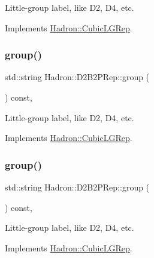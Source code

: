 Little-\/group label, like D2, D4, etc. 

Implements \mbox{\hyperlink{structHadron_1_1CubicLGRep_a9bdb14b519a611d21379ed96a3a9eb41}{Hadron\+::\+Cubic\+L\+G\+Rep}}.

\mbox{\label{structHadron_1_1D2B2PRep_a5e6b85d31dc1c9bec4956b4c6bccd01e}} 
\subsubsection{\texorpdfstring{group()}{group()}\hspace{0.1cm}{\footnotesize\ttfamily [2/3]}}
{\footnotesize\ttfamily std\+::string Hadron\+::\+D2\+B2\+P\+Rep\+::group (\begin{DoxyParamCaption}{ }\end{DoxyParamCaption}) const\hspace{0.3cm}{\ttfamily [inline]}, {\ttfamily [virtual]}}

Little-\/group label, like D2, D4, etc. 

Implements \mbox{\hyperlink{structHadron_1_1CubicLGRep_a9bdb14b519a611d21379ed96a3a9eb41}{Hadron\+::\+Cubic\+L\+G\+Rep}}.

\mbox{\label{structHadron_1_1D2B2PRep_a5e6b85d31dc1c9bec4956b4c6bccd01e}} 
\subsubsection{\texorpdfstring{group()}{group()}\hspace{0.1cm}{\footnotesize\ttfamily [3/3]}}
{\footnotesize\ttfamily std\+::string Hadron\+::\+D2\+B2\+P\+Rep\+::group (\begin{DoxyParamCaption}{ }\end{DoxyParamCaption}) const\hspace{0.3cm}{\ttfamily [inline]}, {\ttfamily [virtual]}}

Little-\/group label, like D2, D4, etc. 

Implements \mbox{\hyperlink{structHadron_1_1CubicLGRep_a9bdb14b519a611d21379ed96a3a9eb41}{Hadron\+::\+Cubic\+L\+G\+Rep}}.

\mbox{\label{structHadron_1_1D2B2PRep_a5def410cb7d63545ef2a907e86c16bf3}} 
